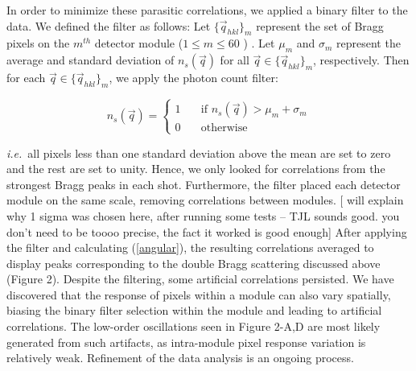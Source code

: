 \documentclass [11pt,fleqn]{article}
\begin{document}
In order to minimize these parasitic correlations, we applied a binary filter to the data. We defined the filter as follows: Let $\{ \vec{q}_{hkl} \}_{m}$ represent the set of Bragg pixels on the $m^{th}$ detector module ($1 \leq m \leq 60$ ) . Let $\mu_m$ and $\sigma_m$ represent the average and standard deviation of $n_{s}(\vec{q})$  for all $\vec{q} \in \{ \vec{q}_{hkl} \}_{m} $, respectively. Then for each $\vec{q} \in \{ \vec{q}_{hkl} \}_{m} $, we apply the photon count filter:

\[  n_{s}(\vec{q} ) = 
 \begin{cases} 
   1 & \quad \text{if } n_{s}(\vec{q} ) > \mu_m +  \sigma_m\\
   0 & \quad \text{otherwise} 
 \end{cases} 
 \]

\textit{i.e.}~all pixels less than one standard deviation above the mean are set to zero and the rest are set to unity. Hence, we only looked for correlations from the strongest Bragg peaks in each shot. Furthermore, the filter placed each detector module on the same scale, removing correlations between modules. [  will explain why 1 sigma was chosen here, after running some tests -- TJL sounds good. you don't need to be toooo precise, the fact it worked is good enough]  After applying the filter and calculating (\ref{angular}), the resulting correlations averaged to display peaks corresponding to the double Bragg scattering discussed above (Figure 2). Despite the filtering, some artificial correlations persisted. We have discovered that the response of pixels within a module can also vary spatially, biasing the binary filter selection within the module and leading to artificial correlations. The low-order oscillations seen in Figure 2-A,D are most likely generated from such artifacts, as intra-module pixel response variation is relatively weak. Refinement of the data analysis is an ongoing process.
\end{document}

